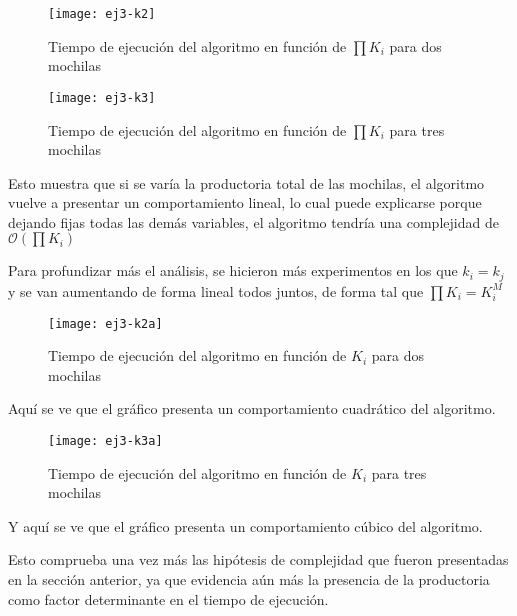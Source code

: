 \begin{figure}[H]
		\centering
		\texttt{[image: ej3-k2]}
		\caption{Tiempo de ejecución del algoritmo en función de $\prod K_i$ para dos mochilas}
	\end{figure}

\begin{figure}[H]
		\centering
		\texttt{[image: ej3-k3]}
		\caption{Tiempo de ejecución del algoritmo en función de $\prod K_i$ para tres mochilas}
	\end{figure}	

Esto muestra que si se varía la productoria total de las mochilas, el algoritmo vuelve a presentar un comportamiento lineal, lo cual puede explicarse porque dejando fijas todas las demás variables, el algoritmo tendría una complejidad de $\mathcal{O}(\prod K_i)$

Para profundizar más el análisis, se hicieron más experimentos en los que $k_i = k_j$ y se van aumentando de forma lineal todos juntos, de forma tal que $\prod K_i = K_i^M$

\begin{figure}[H]
		\centering
		\texttt{[image: ej3-k2a]}
		\caption{Tiempo de ejecución del algoritmo en función de $K_i$ para dos mochilas}
	\end{figure}	

Aquí se ve que el gráfico presenta un comportamiento cuadrático del algoritmo.

\begin{figure}[H]
		\centering
		\texttt{[image: ej3-k3a]}
		\caption{Tiempo de ejecución del algoritmo en función de $K_i$ para tres mochilas}
	\end{figure}	

Y aquí se ve que el gráfico presenta un comportamiento cúbico del algoritmo.

Esto comprueba una vez más las hipótesis de complejidad que fueron presentadas en la sección anterior, ya que evidencia aún más la presencia de la productoria como factor determinante en el tiempo de ejecución.